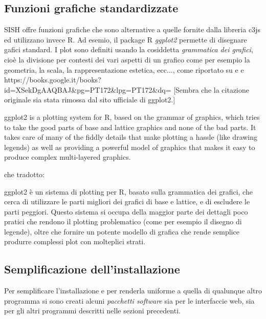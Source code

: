 \documentclass[10pt,titlepage,twoside,a4paper]{report}
\begin{document}
        \subsection{Funzioni grafiche standardizzate}
SISH offre funzioni grafiche che sono alternative a quelle fornite dalla 
libreria c3js ed utilizzano invece R. Ad esemio, il package R \emph{ggplot2} 
permette di disegnare gafici standard. I plot sono definiti usando la 
cosiddetta \emph{grammatica dei grafici}, cioè la divisione per contesti dei 
vari aspetti di un grafico come per esempio la geometria, la scala, la 
rappresentazione estetica, ecc..., come riportato su \cite{grammarOfGraphics} e 
\cite{ggplot2} e 
https://books.google.it/books?id=XSekDgAAQBAJ\&pg=PT172\&lpg=PT172\&dq=%
[Sembra che la citazione originale sia stata rimossa dal sito ufficiale
di ggplot2.]

\begin{displayquote}
ggplot2 is a plotting system for R, based on the grammar of graphics, which 
tries to take the good parts of base and lattice graphics and none of the bad 
parts. It takes care of many of the fiddly details that make plotting a hassle 
(like drawing legends) as well as providing a powerful model of graphics that 
makes it easy to produce complex multi-layered graphics.
\end{displayquote}

che tradotto:
\begin{displayquote}
ggplot2 è un sistema di plotting per R, basato sulla grammatica dei grafici,
che cerca di utilizzare le parti migliori dei grafici di base e lattice, e di 
escludere le parti peggiori. Questo sistema si occupa della maggior parte dei
dettagli poco pratici che rendono il plotting problematico (come per esempio 
il disegno di legende), oltre che fornire un potente modello di grafica che
rende semplice produrre complessi plot con molteplici strati.
\end{displayquote}


        \subsection{Semplificazione dell'installazione}
Per semplificare l'installazione e per renderla uniforme a quella di qualunque 
altro programma si sono creati alcuni \emph{pacchetti software} sia per 
le interfaccie web, sia per gli altri programmi descritti nelle sezioni 
precedenti.
\end{document}
